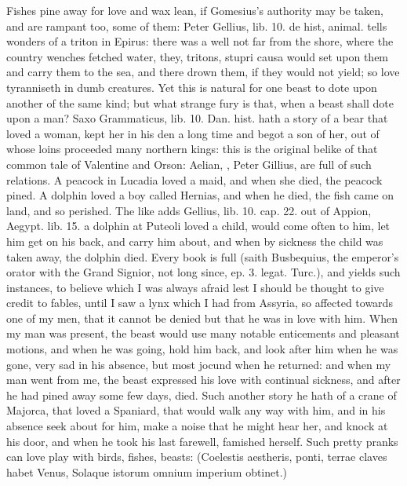 Fishes pine away for love and wax lean, if Gomesius's authority
may be taken, and are rampant too, some of them: Peter Gellius, lib.
10. de hist, animal. tells wonders of a triton in Epirus: there was a
well not far from the shore, where the country wenches fetched water,
they, tritons, stupri causa would set upon them and carry them to
the sea, and there drown them, if they would not yield; so love
tyranniseth in dumb creatures. Yet this is natural for one beast to
dote upon another of the same kind; but what strange fury is that, when
a beast shall dote upon a man? Saxo Grammaticus, lib. 10. Dan. hist.
hath a story of a bear that loved a woman, kept her in his den a long
time and begot a son of her, out of whose loins proceeded many northern
kings: this is the original belike of that common tale of Valentine and
Orson: Aelian, \Pliny{}, Peter Gillius, are full of such relations. A
peacock in Lucadia loved a maid, and when she died, the peacock pined.
A dolphin loved a boy called Hernias, and when he died, the fish
came on land, and so perished. The like adds Gellius, lib. 10. cap. 22.
out of Appion, Aegypt. lib. 15. a dolphin at Puteoli loved a child,
would come often to him, let him get on his back, and carry him about,
and when by sickness the child was taken away, the dolphin died.
Every book is full (saith Busbequius, the emperor's orator with
the Grand Signior, not long since, ep. 3. legat. Turc.), and yields
such instances, to believe which I was always afraid lest I should be
thought to give credit to fables, until I saw a lynx which I had from
Assyria, so affected towards one of my men, that it cannot be denied
but that he was in love with him. When my man was present, the beast
would use many notable enticements and pleasant motions, and when he
was going, hold him back, and look after him when he was gone, very sad
in his absence, but most jocund when he returned: and when my man went
from me, the beast expressed his love with continual sickness, and
after he had pined away some few days, died. Such another story he hath
of a crane of Majorca, that loved a Spaniard, that would walk any way
with him, and in his absence seek about for him, make a noise that he
might hear her, and knock at his door, and when he took his last
farewell, famished herself. Such pretty pranks can love play with
birds, fishes, beasts:
(Coelestis aestheris, ponti, terrae claves habet Venus,
Solaque istorum omnium imperium obtinet.)

